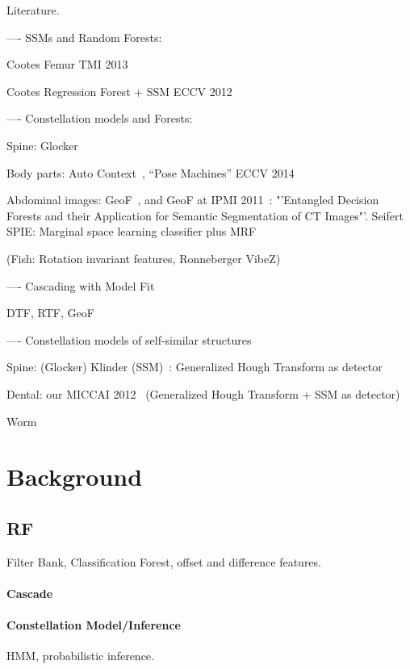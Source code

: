 \documentclass[10pt,twocolumn,letterpaper]{article}
\begin{document}
Literature.

---- SSMs and Random Forests:

Cootes Femur TMI 2013~\cite{CootesFemurTMI2013}

Cootes Regression Forest + SSM ECCV 2012~\cite{CootesECCV2012RRFandSSM}

---- Constellation models and Forests:

Spine: Glocker~\cite{Glocker2013}

Body parts: Auto Context~\cite{AutoContext2008}, "`Pose Machines"' ECCV 2014~\cite{PoseMachinesECCV2014}

Abdominal images: GeoF~\cite{GeoForests2013}, and GeoF at IPMI 2011~\cite{CriminisiAbdominalIPMI2011}: "'Entangled Decision Forests and their Application for Semantic Segmentation of CT Images"'. Seifert SPIE: Marginal space learning classifier plus MRF~\cite{SeifertAnatomicalSPIE2009} 

(Fish: Rotation invariant features, Ronneberger VibeZ)

---- Cascading with Model Fit

DTF, RTF, GeoF

---- Constellation models of self-similar structures

Spine: (Glocker) Klinder (SSM)~\cite{Klinder2009471}: Generalized Hough Transform as detector

Dental: our MICCAI 2012~\cite{TeethMICCAI2012} (Generalized Hough Transform + SSM as detector)

Worm~\cite{WormMiccai2014}

\section{Background}

\subsection{RF}
Filter Bank, Classification Forest, offset and difference features. 

\paragraph{Cascade}

\paragraph{Constellation Model/Inference}
HMM, probabilistic inference.
\end{document}
